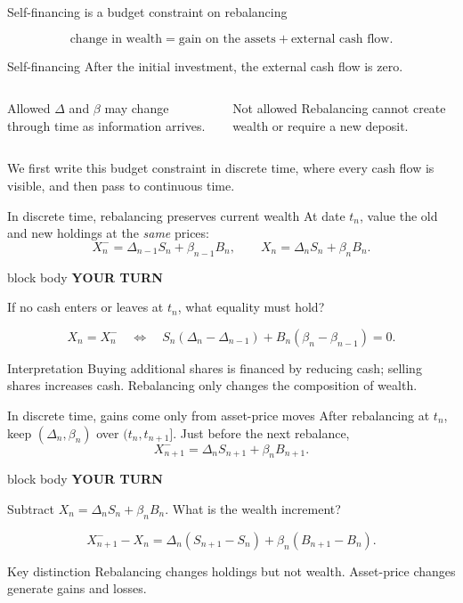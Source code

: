 \documentclass[handout,10pt,aspectratio=169]{beamer}
\newenvironment{pausebox}{%
  \begin{beamercolorbox}[rounded=true,sep=0.8em,wd=\textwidth]{block body}
  \textbf{\color{CourseGold}YOUR TURN}\quad
}{\end{beamercolorbox}}
\newcommand{\1}{\mathbf 1}
\begin{document}
\begin{frame}{Self-financing is a budget constraint on rebalancing}
\begin{center}
\Large
\[
\text{change in wealth}
=
\text{gain on the assets}
+\text{external cash flow}.
\]
\end{center}

\begin{block}{Self-financing}
After the initial investment, the external cash flow is zero.
\end{block}
\begin{columns}[T,onlytextwidth]
\begin{exampleblock}{Allowed}
\(\Delta\) and \(\beta\) may change through time as information arrives.
\end{exampleblock}
\begin{alertblock}{Not allowed}
Rebalancing cannot create wealth or require a new deposit.
\end{alertblock}
\end{columns}
\medskip
We first write this budget constraint in discrete time, where every cash flow
is visible, and then pass to continuous time.
\end{frame}

\begin{frame}{In discrete time, rebalancing preserves current wealth}
\small
At date \(t_n\), value the old and new holdings at the \emph{same} prices:
\[
X_n^-=\Delta_{n-1}S_n+\beta_{n-1}B_n,
\qquad
X_n=\Delta_nS_n+\beta_nB_n.
\]
\begin{pausebox}
If no cash enters or leaves at \(t_n\), what equality must hold?
\end{pausebox}

\[
X_n=X_n^-
\quad\Longleftrightarrow\quad
\boxed{
S_n(\Delta_n-\Delta_{n-1})
+B_n(\beta_n-\beta_{n-1})=0.}
\]
\begin{block}{Interpretation}
Buying additional shares is financed by reducing cash; selling shares
increases cash. Rebalancing only changes the composition of wealth.
\end{block}
\end{frame}

\begin{frame}{In discrete time, gains come only from asset-price moves}
\small
After rebalancing at \(t_n\), keep \((\Delta_n,\beta_n)\) over
\((t_n,t_{n+1}]\). Just before the next rebalance,
\[
X_{n+1}^-=\Delta_nS_{n+1}+\beta_nB_{n+1}.
\]
\begin{pausebox}
Subtract \(X_n=\Delta_nS_n+\beta_nB_n\). What is the wealth increment?
\end{pausebox}

\[
\boxed{
X_{n+1}^--X_n
=\Delta_n(S_{n+1}-S_n)
+\beta_n(B_{n+1}-B_n).}
\]
\begin{exampleblock}{Key distinction}
Rebalancing changes holdings but not wealth. Asset-price changes generate
gains and losses.
\end{exampleblock}
\end{frame}
\end{document}
